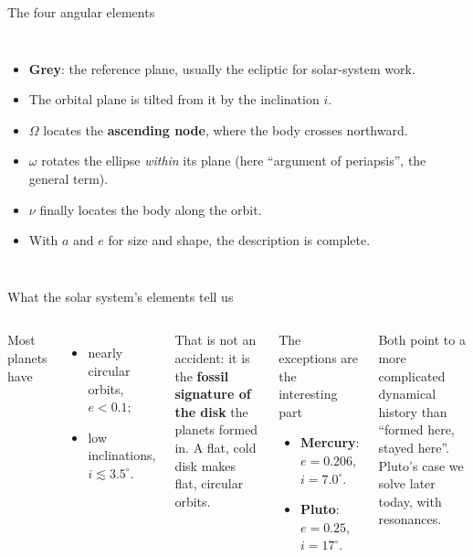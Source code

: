 \documentclass[aspectratio=169, 11pt]{beamer}
\begin{document}
\begin{frame}{The four angular elements}
  \begin{columns}[c]
    \column{\recapfigcolnarrow}
    \centering

    \column{\recaptextcolwide}
    \small
    \begin{itemize}
      \item \textbf{Grey}: the reference plane, usually the ecliptic for solar-system work.
      \item The orbital plane is tilted from it by the inclination $i$.
      \item $\Omega$ locates the \textbf{ascending node}, where the body crosses northward.
      \item $\omega$ rotates the ellipse \emph{within} its plane (here ``argument of periapsis'', the general term).
      \item $\nu$ finally locates the body along the orbit.
      \item With $a$ and $e$ for size and shape, the description is complete.
    \end{itemize}
  \end{columns}
\end{frame}

\begin{frame}{What the solar system's elements tell us}
  \begin{columns}[T]
    Most planets have
    \begin{itemize}
      \item nearly circular orbits, $e < 0.1$;
      \item low inclinations, $i \lesssim 3.5^{\circ}$.
    \end{itemize}
    \vskip6pt\relax
    That is not an accident: it is the \textbf{fossil signature of the disk} the planets formed in. A flat, cold disk makes flat, circular orbits.

    \begin{block}{The exceptions are the interesting part}
      \begin{itemize}
        \item \textbf{Mercury}: $e = 0.206$, $i = 7.0^{\circ}$.
        \item \textbf{Pluto}: $e = 0.25$, $i = 17^{\circ}$.
      \end{itemize}
    \end{block}
    \vskip8pt\relax
    Both point to a more complicated dynamical history than ``formed here, stayed here''. Pluto's case we solve later today, with resonances.
  \end{columns}
\end{frame}
\end{document}
